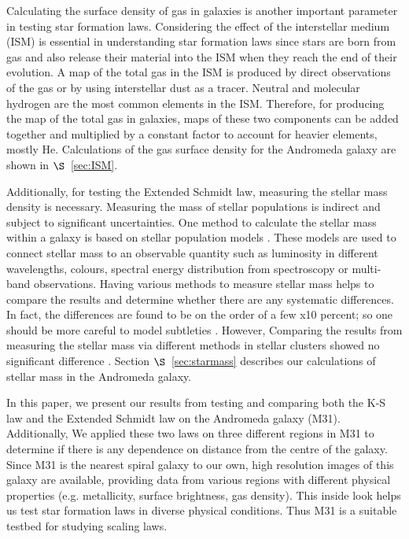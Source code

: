 \documentclass[useAMS,usenatbib]{mn2e}
\begin{document}
Calculating the surface density of gas in galaxies is another important parameter in testing star formation laws. Considering the effect of the interstellar medium (ISM) is essential in understanding star formation laws since stars are born from gas and also release their material into the ISM when they reach the end of their evolution. A map of the total gas in the ISM is produced by direct observations of the gas or by using interstellar dust as a tracer. Neutral and molecular hydrogen are the most common elements in the ISM. Therefore, for producing the map of the total gas in galaxies, maps of these two components can be added together and multiplied by a constant factor to account for heavier elements, mostly He. Calculations of the gas surface density for the Andromeda galaxy are shown in $\S$~\ref{sec:ISM}. %

Additionally, for testing the Extended Schmidt law, measuring the stellar mass density is necessary. Measuring the mass of stellar populations is indirect and subject to significant uncertainties. One method to calculate the stellar mass within a galaxy is based on stellar population models \citep[e.g.][]{ Bruzual93, Kotulla09}. These models are used to connect stellar mass to an observable quantity such as luminosity in different wavelengths, colours, spectral energy distribution from spectroscopy or multi-band observations. Having various methods to measure stellar mass helps to compare the results and determine whether there are any systematic differences. In fact, the differences are found to be on the order of a few x10 percent; so one should be more careful to model subtleties \citep{McLaughlin05}. However, Comparing the results from measuring the stellar mass via different methods in stellar clusters showed no significant difference \citep{Tamm12}. Section $\S$~\ref{sec:starmass} describes our calculations of stellar mass in the Andromeda galaxy. %



In this paper, we present our results from testing and comparing both the K-S law and the Extended Schmidt law on the Andromeda galaxy (M31). Additionally, We applied these two laws on three different regions in M31 to determine if there is any dependence on distance from the centre of the galaxy. Since M31 is the nearest spiral galaxy to our own, high resolution images of this galaxy are available, providing data from various regions with different physical properties (e.g. metallicity, surface brightness, gas density). This inside look helps us test star formation laws in diverse physical conditions. Thus M31 is a suitable testbed for studying scaling laws. %
\end{document}
